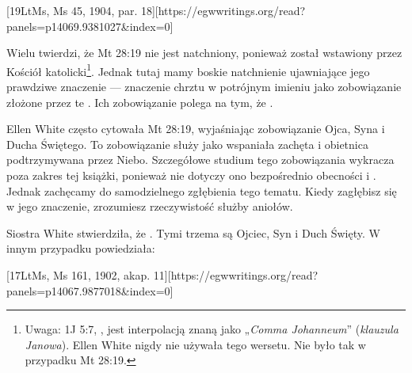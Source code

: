 [19LtMs, Ms 45, 1904, par. 18][https://egwwritings.org/read?panels=p14069.9381027&index=0]

Wielu twierdzi, że Mt 28:19 nie jest natchniony, ponieważ został wstawiony przez Kościół katolicki\footnote{Uwaga: 1J 5:7, , jest interpolacją znaną jako „\textit{Comma Johanneum}” (\textit{klauzula Janowa}). Ellen White nigdy nie używała tego wersetu. Nie było tak w przypadku Mt 28:19.}. Jednak tutaj mamy boskie natchnienie ujawniające jego prawdziwe znaczenie — znaczenie chrztu w potrójnym imieniu jako zobowiązanie złożone przez te . Ich zobowiązanie polega na tym, że .

Ellen White często cytowała Mt 28:19, wyjaśniając zobowiązanie Ojca, Syna i Ducha Świętego. To zobowiązanie służy jako wspaniała zachęta i obietnica podtrzymywana przez Niebo. Szczegółowe studium tego zobowiązania wykracza poza zakres tej książki, ponieważ nie dotyczy ono bezpośrednio obecności i . Jednak zachęcamy do samodzielnego zgłębienia tego tematu. Kiedy zagłębisz się w jego znaczenie, zrozumiesz rzeczywistość służby aniołów.

Siostra White stwierdziła, że . Tymi trzema są Ojciec, Syn i Duch Święty. W innym przypadku powiedziała:

[17LtMs, Ms 161, 1902, akap. 11][https://egwwritings.org/read?panels=p14067.9877018&index=0]

